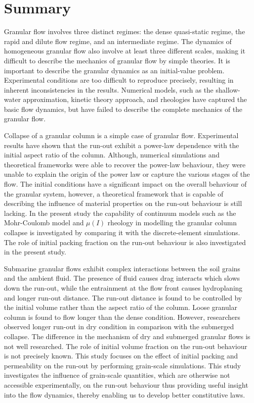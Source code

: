 \section{Summary}
Granular flow involves three distinct regimes: the dense quasi-static regime, 
the rapid and dilute flow regime, and an intermediate regime. The dynamics of 
homogeneous granular flow also involve at least three different scales, making 
it difficult to describe the mechanics of granular flow by simple theories. It 
is important to describe the granular dynamics as an initial-value problem. 
Experimental conditions are too difficult to reproduce precisely, 
resulting in inherent inconsistencies in the results. Numerical models, such as 
the shallow-water approximation, kinetic theory approach, and rheologies have 
captured the basic flow dynamics, but have failed to describe 
the complete mechanics of the granular flow.

Collapse of a granular column is a simple case of granular flow. Experimental 
results have shown that the run-out exhibit a power-law dependence with the 
initial aspect ratio of the column. Although, numerical simulations and 
theoretical frameworks were able to recover the power-law behaviour, they were 
unable to explain the origin of the power law or capture the various stages of 
the flow. The initial conditions have a significant impact on the overall 
behaviour of the granular system, however, a theoretical framework that is 
capable of describing the influence of material properties on the run-out 
behaviour is still lacking. In the present study the capability of continuum 
models such as the Mohr-Coulomb model and $\mu(I)$ rheology in modelling the 
granular column collapse is investigated by comparing it with the 
discrete-element simulations. The role of initial packing fraction on the 
run-out behaviour is also investigated in the present study.

Submarine granular flows exhibit complex interactions between the soil grains 
and the ambient fluid. The presence of fluid causes drag interacts which slows 
down the run-out, while the entrainment at the flow front causes hydroplaning 
and longer run-out distance. The run-out distance is found to be controlled by 
the initial volume rather than the aspect ratio of the column. Loose granular 
column is found to flow longer than the dense condition. However, researchers 
observed longer run-out in dry condition in comparison with the submerged 
collapse. The difference in the mechanism of dry and submerged granular flows 
is not well researched. The role of initial volume fraction on the run-out 
behaviour is not precisely known. This study focuses on the effect of initial 
packing and permeability on the run-out by performing grain-scale simulations. 
This study investigates the influence of grain-scale quantities, which are 
otherwise not accessible experimentally, on the run-out behaviour thus 
providing useful insight into the flow dynamics, thereby enabling us to develop 
better constitutive laws. 



